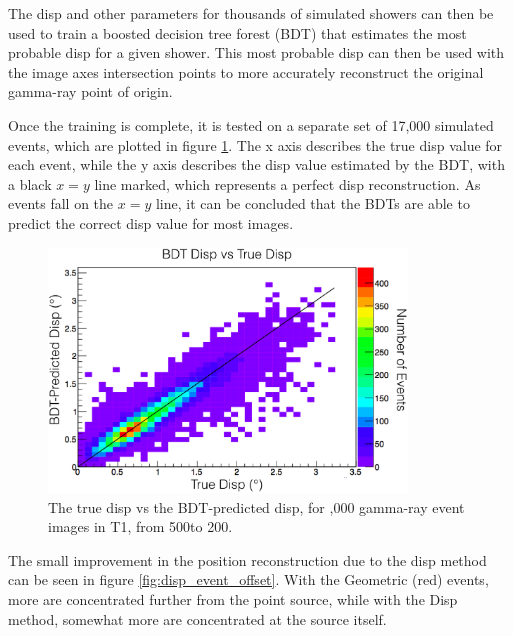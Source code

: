     The disp and other parameters for thousands of simulated showers can then be used to train a boosted decision tree forest (BDT) that estimates the most probable disp for a given shower.
    This most probable disp can then be used with the image axes intersection points to more accurately reconstruct the original gamma-ray point of origin.

    Once the training is complete, it is tested on a separate set of 17,000 simulated events, which are plotted in figure \ref{fig:disptraining}.
    The x axis describes the true disp value for each event, while the y axis describes the disp value estimated by the BDT, with a black $x=y$ line marked, which represents a perfect disp reconstruction.
    As events fall on the $x=y$ line, it can be concluded that the BDTs are able to predict the correct disp value for most images.

    \begin{figure}[ht]
      \begin{center}
        \includegraphics[width=0.85\textwidth]{images/disp_training.eps}
        \caption[Disp BDT Training]{The true disp vs the BDT-predicted disp, for ,000 gamma-ray event images in T1, from 500\GeV to 200\TeV.}\label{fig:disptraining}
      \end{center}
    \end{figure}

    The small improvement in the position reconstruction due to the disp method can be seen in figure \ref{fig:disp_event_offset}.
    With the Geometric (red) events, more are concentrated further from the point source, while with the Disp method, somewhat more are concentrated at the source itself.

